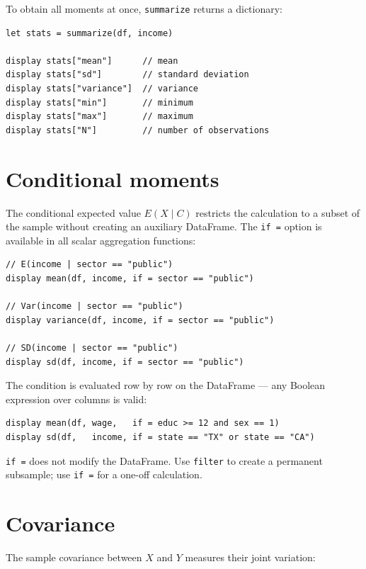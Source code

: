 To obtain all moments at once, \lstinline{summarize} returns a dictionary:

\begin{lstlisting}
let stats = summarize(df, income)

display stats["mean"]      // mean
display stats["sd"]        // standard deviation
display stats["variance"]  // variance
display stats["min"]       // minimum
display stats["max"]       // maximum
display stats["N"]         // number of observations
\end{lstlisting}

\section{Conditional moments}

The conditional expected value $E(X \mid C)$ restricts the calculation to
a subset of the sample without creating an auxiliary DataFrame. The
\lstinline{if =} option is available in all scalar aggregation functions:

\begin{lstlisting}[caption={Conditional moments with if =}]
// E(income | sector == "public")
display mean(df, income, if = sector == "public")

// Var(income | sector == "public")
display variance(df, income, if = sector == "public")

// SD(income | sector == "public")
display sd(df, income, if = sector == "public")
\end{lstlisting}

The condition is evaluated row by row on the DataFrame — any Boolean
expression over columns is valid:

\begin{lstlisting}[caption={Compound conditions}]
display mean(df, wage,   if = educ >= 12 and sex == 1)
display sd(df,   income, if = state == "TX" or state == "CA")
\end{lstlisting}

\begin{dica}
  \lstinline{if =} does not modify the DataFrame. Use \lstinline{filter}
  to create a permanent subsample; use \lstinline{if =} for a one-off
  calculation.
\end{dica}

\section{Covariance}

The sample covariance between $X$ and $Y$ measures their joint variation:


